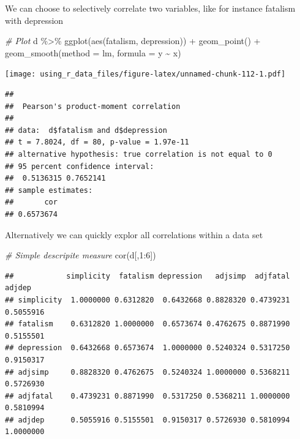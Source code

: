 \documentclass[
]{book}
\newenvironment{Shaded}{\begin{snugshade}}{\end{snugshade}}
\newcommand{\AttributeTok}[1]{\textcolor[rgb]{0.77,0.63,0.00}{#1}}
\newcommand{\CommentTok}[1]{\textcolor[rgb]{0.56,0.35,0.01}{\textit{#1}}}
\newcommand{\DecValTok}[1]{\textcolor[rgb]{0.00,0.00,0.81}{#1}}
\newcommand{\FunctionTok}[1]{\textcolor[rgb]{0.00,0.00,0.00}{#1}}
\newcommand{\NormalTok}[1]{#1}
\newcommand{\SpecialCharTok}[1]{\textcolor[rgb]{0.00,0.00,0.00}{#1}}
\newcommand{\StringTok}[1]{\textcolor[rgb]{0.31,0.60,0.02}{#1}}
\begin{document}
We can choose to selectively correlate two variables, like for instance fatalism with depression

\begin{Shaded}
\begin{Highlighting}[]
\CommentTok{\# Plot}
\NormalTok{d }\SpecialCharTok{\%\textgreater{}\%} 
  \FunctionTok{ggplot}\NormalTok{(}\FunctionTok{aes}\NormalTok{(fatalism, depression)) }\SpecialCharTok{+} 
  \FunctionTok{geom\_point}\NormalTok{() }\SpecialCharTok{+}
  \FunctionTok{geom\_smooth}\NormalTok{(}\AttributeTok{method =} \StringTok{\textquotesingle{}lm\textquotesingle{}}\NormalTok{, }\AttributeTok{formula =} \StringTok{\textquotesingle{}y \textasciitilde{} x\textquotesingle{}}\NormalTok{)}
\end{Highlighting}
\end{Shaded}

\texttt{[image: using\_r\_data\_files/figure-latex/unnamed-chunk-112-1.pdf]}

\begin{Shaded}
\end{Shaded}

\begin{verbatim}
## 
##  Pearson's product-moment correlation
## 
## data:  d$fatalism and d$depression
## t = 7.8024, df = 80, p-value = 1.97e-11
## alternative hypothesis: true correlation is not equal to 0
## 95 percent confidence interval:
##  0.5136315 0.7652141
## sample estimates:
##       cor 
## 0.6573674
\end{verbatim}

Alternatively we can quickly explor all correlations within a data set

\begin{Shaded}
\begin{Highlighting}[]
\CommentTok{\# Simple descripite measure}
\FunctionTok{cor}\NormalTok{(d[,}\DecValTok{1}\SpecialCharTok{:}\DecValTok{6}\NormalTok{])}
\end{Highlighting}
\end{Shaded}

\begin{verbatim}
##            simplicity  fatalism depression   adjsimp  adjfatal    adjdep
## simplicity  1.0000000 0.6312820  0.6432668 0.8828320 0.4739231 0.5055916
## fatalism    0.6312820 1.0000000  0.6573674 0.4762675 0.8871990 0.5155501
## depression  0.6432668 0.6573674  1.0000000 0.5240324 0.5317250 0.9150317
## adjsimp     0.8828320 0.4762675  0.5240324 1.0000000 0.5368211 0.5726930
## adjfatal    0.4739231 0.8871990  0.5317250 0.5368211 1.0000000 0.5810994
## adjdep      0.5055916 0.5155501  0.9150317 0.5726930 0.5810994 1.0000000
\end{verbatim}
\end{document}
